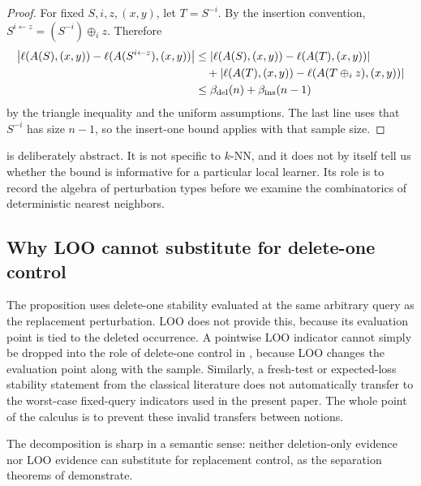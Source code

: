 \begin{proof}
For fixed $S,i,z,(x,y)$, let $T=S^{-i}$.  By the insertion convention,
$S^{i\leftarrow z}=(S^{-i})\oplus_i z$.  Therefore
\begin{align*}
\left|\ell(A(S),(x,y))-\ell(A(S^{i\leftarrow z}),(x,y))\right|
&\le
\left|\ell(A(S),(x,y))-\ell(A(T),(x,y))\right| \\
&\quad +
\left|\ell(A(T),(x,y))-\ell(A(T\oplus_i z),(x,y))\right| \\
&\le \beta_{\mathrm{del}}(n) + \beta_{\mathrm{ins}}(n-1)
\end{align*}
by the triangle inequality and the uniform assumptions.  The last line uses
that $S^{-i}$ has size $n-1$, so the insert-one bound applies with that sample
size.
\end{proof}

 is deliberately abstract.  It is not specific to $k$-NN, and it
does not by itself tell us whether the bound is informative for a particular
local learner.  Its role is to record the algebra of perturbation types before
we examine the combinatorics of deterministic nearest neighbors.

\subsection{Why LOO cannot substitute for delete-one control}

The proposition uses delete-one stability evaluated at the same arbitrary query
as the replacement perturbation.  LOO does not provide this, because its
evaluation point is tied to the deleted occurrence.  A pointwise LOO indicator
cannot simply be dropped into the role of delete-one control in
, because LOO changes the evaluation point along with the
sample.  Similarly, a fresh-test or expected-loss stability statement from the
classical literature does not automatically transfer to the worst-case
fixed-query indicators used in the present paper.  The whole point of the
calculus is to prevent these invalid transfers between notions.

The decomposition is sharp in a semantic sense: neither deletion-only evidence
nor LOO evidence can substitute for replacement control, as the separation
theorems of 
demonstrate.

